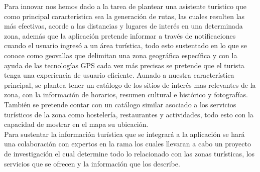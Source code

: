 	
	Para innovar nos hemos dado a la tarea de plantear una asistente turístico que como principal característica sea la generación de rutas, las cuales resulten las más efectivas, acorde a las distancias y lugares de interés en una determinada zona, además que la aplicación pretende informar a través de notificaciones cuando el usuario ingresó a un área turística, todo esto sustentado en lo que se conoce como geovallas que delimitan una zona geográfica específica y con la ayuda de las tecnologías GPS cada vez más precisas se pretende que el turista tenga una experiencia de usuario eficiente. 
	Aunado a nuestra característica principal, se plantea tener un catálogo de los sitios de interés mas relevantes de la zona, con la información de horarios, resumen cultural e histórico y fotografías. También se pretende contar con un catálogo similar asociado a los servicios turísticos de la zona como hostelería, restaurantes y actividades, todo esto con la capacidad de mostrar en el mapa su ubicación.\\
	
	Para sustentar la información turística que se integrará a la aplicación se hará una colaboración con expertos en la rama los cuales llevaran a cabo un proyecto de investigación el cual determine todo lo relacionado con las zonas turísticas, los servicios que se ofrecen y la información que los describe.

